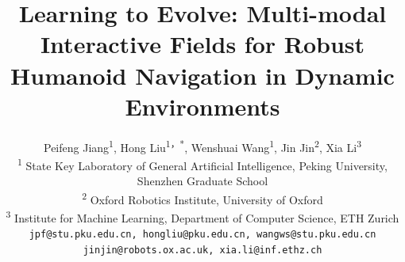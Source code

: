 \documentclass[conference]{IEEEtran}
\begin{document}
\title{Learning to Evolve: Multi-modal Interactive Fields for Robust Humanoid Navigation in Dynamic Environments}



\author{ Peifeng Jiang\textsuperscript{1}, Hong Liu\textsuperscript{1，*}, Wenshuai Wang\textsuperscript{1}, Jin Jin\textsuperscript{2}, Xia Li\textsuperscript{3} \\
  \textsuperscript{1} State Key Laboratory of General Artificial Intelligence,  Peking University, Shenzhen Graduate School \\
  \textsuperscript{2} Oxford Robotics Institute, University of Oxford \\
  \textsuperscript{3} Institute for Machine Learning, Department of Computer Science, ETH Zurich \\
  \texttt{jpf@stu.pku.edu.cn, hongliu@pku.edu.cn, wangws@stu.pku.edu.cn} \\ \texttt{jinjin@robots.ox.ac.uk, xia.li@inf.ethz.ch\\}}
\end{document}
